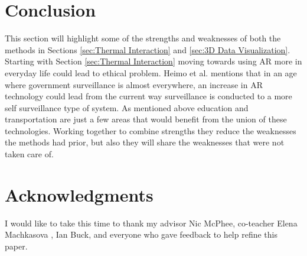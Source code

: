 \documentclass{sig-alternate}
\begin{document}
\section{Conclusion}
\label{Conclusion}
This section will highlight some of the strengths and weaknesses of both the methods in Sections \ref{sec:Thermal Interaction} and \ref{sec:3D Data Visualization}. Starting with Section \ref{sec:Thermal Interaction} moving towards using AR more in everyday life could lead to ethical problem. Heimo et al. \cite{ethics} mentions that in an age where government surveillance is almost everywhere, an increase in AR technology could lead from the current way surveillance is conducted to a more self surveillance type of system.
As mentioned above education and transportation are just a few areas that would benefit from the union of these technologies. Working together to combine strengths they reduce the weaknesses the methods had prior, but also they will share the weaknesses that were not taken care of.  


\section{Acknowledgments}
\label{sec:Acknowledgments}
I would like to take this time to thank my advisor Nic McPhee, co-teacher Elena Machkasova    , Ian Buck, and everyone who gave feedback to help refine this paper. 


\end{document}
